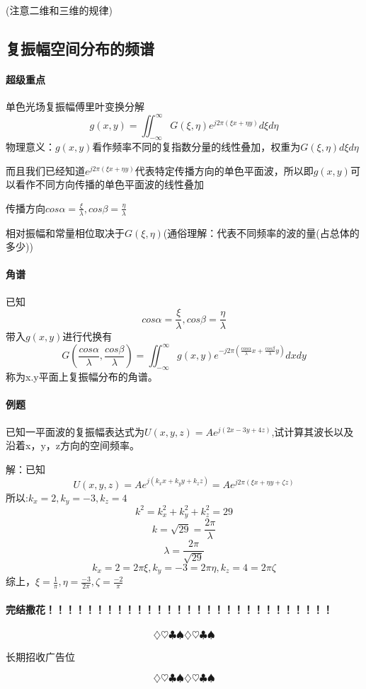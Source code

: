 \documentclass[UTF8]{ctexart}
\newcommand{\f}[2]{\frac{#1}{#2}}%
\newcommand{\dbinf}{\iint_{-\infty}^{\infty}}
\begin{document}
    (注意二维和三维的规律)
\subsection{复振幅空间分布的频谱}
\paragraph{超级重点}单色光场复振幅傅里叶变换分解
\[g(x,y)=\dbinf G(\xi,\eta)e^{j2\pi(\xi x+\eta y)}d\xi d\eta\]  
物理意义：$g(x,y)$看作频率不同的复指数分量的线性叠加，权重为$G(\xi,\eta)d\xi d\eta$
  
而且我们已经知道$e^{j2\pi(\xi x+\eta y)}$代表特定传播方向的单色平面波，所以即$g(x,y)$可以看作不同方向传播的单色平面波的线性叠加
  
传播方向$cos\alpha=\f{\xi}{\lambda},cos\beta=\f{\eta}{\lambda}$

相对振幅和常量相位取决于$G(\xi,\eta)$(通俗理解：代表不同频率的波的量(占总体的多少))
  
\paragraph{角谱}已知
\[cos\alpha=\frac{\xi}{\lambda},cos\beta=\f{\eta}{\lambda}
\]  
带入$g(x,y)$进行代换有
\[G(\f{cos\alpha}{\lambda},\f{cos\beta}{\lambda})=\dbinf g(x,y)e^{-j2\pi(\f{cos\alpha}{\lambda}x+\f{cos\beta}{\lambda}y)}dxdy
    \]
    称为x.y平面上复振幅分布的角谱。
\paragraph{例题}
已知一平面波的复振幅表达式为$U(x,y,z)=Ae^{j(2x-3y+4z)}$,试计算其波长以及沿着x，y，z方向的空间频率。

解：已知\[U(x,y,z)=Ae^{j(k_{x}x+k_{y}y+k_{z}z)}=Ae^{j2\pi(\xi x+\eta y+\zeta z)}
\]
所以:$k_{x}=2,k_{y}=-3,k_{z}=4$
\[k^2=k_{x}^2+k_{y}^2+k_{z}^2=29\]
\[k=\sqrt{29}=\f{2\pi}{\lambda}\]
\[\lambda=\f{2\pi}{\sqrt{29}}\]
\[k_{x}=2=2\pi\xi,k_{y}=-3=2\pi\eta,k_{z}=4=2\pi\zeta\]
综上，$\xi=\f{1}{\pi},\eta=\f{-3}{2\pi},\zeta=\f{-2}{\pi}$

\paragraph{完结撒花！！！！！！！！！！！！！！！！！！！！！！！！！！！！！}

\paragraph{}
\[\diamondsuit\heartsuit\clubsuit\spadesuit\diamondsuit\heartsuit\clubsuit\spadesuit 
\]
\centerline{长期招收广告位}
\[ \diamondsuit\heartsuit\clubsuit\spadesuit\diamondsuit\heartsuit\clubsuit\spadesuit 
\]
\end{document}
